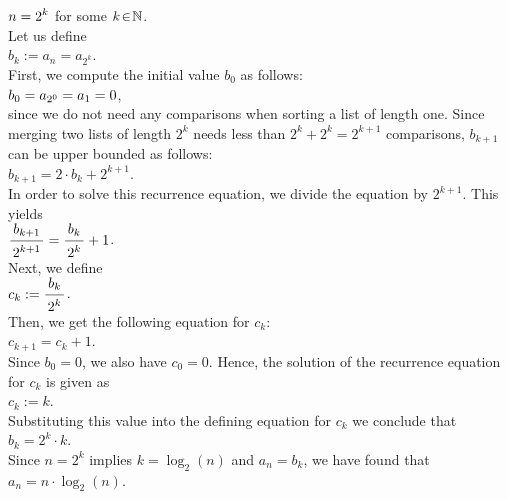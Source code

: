 \hspace*{1.3cm}
$\displaystyle n = 2^k$ \qquad for some $k \!\in\! \mathbb{N}$.
\\[0.2cm]
Let us define
\\[0.2cm]
\hspace*{1.3cm}
$b_k := a_n = a_{2^k}$.
\\[0.2cm]
First, we compute the initial value $b_0$ as follows:
\\[0.2cm]
\hspace*{1.3cm}
$\displaystyle b_0 = a_{2^0} = a_1 = 0$,
\\[0.2cm]
since we do not need any comparisons when sorting a list of length one.  Since merging two lists of
length $2^k$ needs less than  $2^k + 2^k = 2^{k+1}$ comparisons, $b_{k+1}$ can be upper bounded as follows:
\\[0.2cm]
\hspace*{1.3cm}
$b_{k+1} = 2 \cdot b_k + 2^{k+1}$. 
\\[0.2cm]
In order to solve this recurrence equation, we divide the equation by $2^{k+1}$.
This yields
\\[0.2cm]
\hspace*{1.3cm}
$\bruch{b_{k+1}}{2^{k+1}} = \bruch{b_k}{2^k} + 1$.
\\[0.2cm]
Next, we define
\\[0.2cm]
\hspace*{1.3cm}
$c_k := \bruch{b_k}{2^k}$.
\\[0.2cm]
Then, we get the following equation for $c_k$:
\\[0.2cm]
\hspace*{1.3cm}
$c_{k+1} = c_k + 1$.
\\[0.2cm]
Since $b_0 = 0$, we also have $c_0 = 0$.  Hence, the solution of the recurrence equation for $c_k$
is given as
\\[0.2cm]
\hspace*{1.3cm}
$c_k := k$.
\\[0.2cm]
Substituting this value into the defining equation for $c_k$ we conclude that
\\[0.2cm]
\hspace*{1.3cm}
$b_k = 2^k \cdot k$.
\\[0.2cm]
Since $n = 2^k$ implies $k = \log_2(n)$ and $a_n = b_k$, we have found that
\\[0.2cm]
\hspace*{1.3cm}
$a_n = n \cdot \log_2(n)$. 


